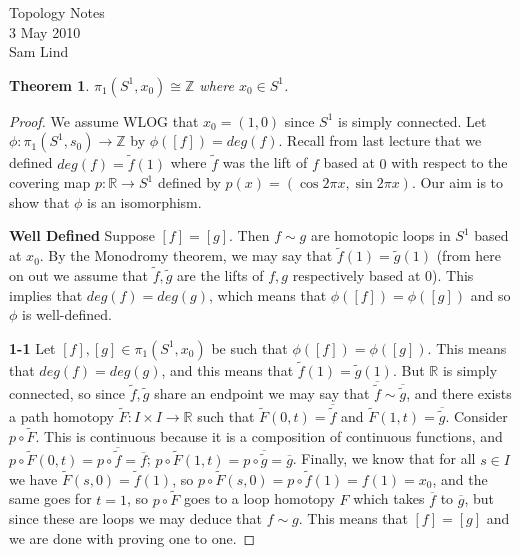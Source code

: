 \documentclass[11pt,reqno]{amsart}
\newtheorem{Theorem}{Theorem}
\theoremstyle{definition}
\begin{document}
    \begin{center}
    \LARGE{Topology Notes} \\
    \vspace{.1in}
    \normalsize{3 May 2010}\\
    \vspace{.1in}
    \normalsize{Sam Lind} \\
    \vspace{.2in}
    \end{center}
\begin{Theorem}
$\pi_1(S^1,x_0)\cong \mathbb{Z}$ where $x_0\in S^1$.
\end{Theorem}

\begin{proof}
We assume WLOG that $x_0=(1,0)$ since $S^1$ is simply connected. Let $\phi \colon \pi_1(S^1,s_0)\to \mathbb{Z}$ by $\phi([f])=deg(f)$. Recall from last lecture that we defined $deg(f)=\tilde{f}(1)$ where $\tilde{f}$ was the lift of $f$ based at $0$ with respect to the covering map $p\colon \mathbb{R}\to S^1$ defined by $p(x)=(\cos 2\pi x, \sin 2\pi x)$. Our aim is to show that $\phi$ is an isomorphism.
\par
\textbf{Well Defined}
\newline
Suppose $[f]=[g]$. Then $f\sim g$ are homotopic loops in $S^1$ based at $x_0$. By the Monodromy theorem, we may say that $\tilde{f}(1)=\tilde{g}(1)$ (from here on out we assume that $\tilde{f},\tilde{g}$ are the lifts of $f,g$ respectively based at $0$). This implies that $deg(f)=deg(g)$, which means that $\phi([f])=\phi([g])$ and so $\phi$ is well-defined.
\par
\textbf{1-1}
\newline
Let $[f],[g]\in \pi_1(S^1,x_0)$ be such that $\phi([f])=\phi([g])$. This means that $deg(f)=deg(g)$, and this means that $\tilde{f}(1)=\tilde{g}(1)$. But $\mathbb{R}$ is simply connected, so since $\tilde{f},\tilde{g}$ share an endpoint we may say that $\overline{\tilde{f}}\sim \overline{\tilde{g}}$, and there exists a path homotopy $\tilde{F}\colon I\times I\to \mathbb{R}$ such that $\tilde{F}(0,t)=\overline{\tilde{f}}$ and $\tilde{F}(1,t)=\overline{\tilde{g}}$. Consider $p\circ \tilde{F}$. This is continuous because it is a composition of continuous functions, and $p\circ \tilde{F}(0,t)=p\circ \overline{\tilde{f}}=\overline{f}$; $p\circ \tilde{F}(1,t)=p\circ \overline{\tilde{g}}=\overline{g}$. Finally, we know that for all $s\in I$ we have $\tilde{F}(s,0)=\tilde{f}(1)$, so $p\circ \tilde{F}(s,0)=p\circ \tilde{f}(1)=f(1)=x_0$, and the same goes for $t=1$, so $p\circ \tilde{F}$ goes to a loop homotopy $F$ which takes $\overline{f}$ to $\overline{g}$, but since these are loops we may deduce that $f\sim g$. This means that $[f]=[g]$ and we are done with proving one to one.

\end{proof}
\end{document}
